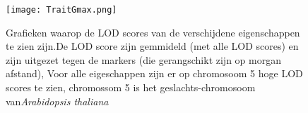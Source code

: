 \documentclass[12pt,a4paper]{article}
\begin{document}
\begin{figure}
\vspace{-1.5cm}
\hspace{-2cm}
\texttt{[image: TraitGmax.png]}
\quad\
\caption[LOD scores per eigenschap]{Grafieken waarop de LOD scores van de verschijdene eigenschappen te zien zijn.De LOD score zijn gemmideld (met alle LOD scores) en zijn uitgezet tegen de markers (die gerangschikt zijn op morgan afstand), Voor alle eigeschappen zijn er op chromosoom 5  hoge LOD scores te zien, chromossom 5  is het geslachts-chromosoom van\textit{Arabidopsis thaliana}}
\end{figure}
\end{document}
